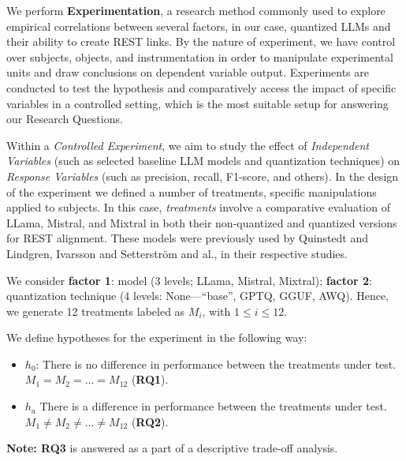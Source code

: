 \documentclass[conference]{IEEEtran}
\begin{document}
We perform \textbf{Experimentation}\cite{wohlin2012experimentation}, a research method commonly used
to explore empirical correlations between several factors, in our case,
quantized LLMs and their ability to create REST links. By the nature of
experiment, we have control over subjects, objects, and instrumentation in order
to manipulate experimental units and draw conclusions on dependent variable
output. Experiments are conducted to test the hypothesis and comparatively
access the impact of specific variables in a controlled setting, which is the
most suitable setup for answering our Research Questions.

Within a \textit{Controlled Experiment}, we aim to study the effect of
\textit{Independent Variables} (such as selected baseline LLM models and
quantization techniques) on \textit{Response Variables} (such as precision,
recall, F1-score, and others)\cite{wohlin2012experimentation}. In the design of
the experiment we defined a number of treatments, specific manipulations applied
to subjects\cite{wohlin2012experimentation}.  In this case, \textit{treatments}
involve a comparative evaluation of LLama, Mistral, and Mixtral in both their
non-quantized and quantized versions for REST alignment. These models were
previously used by Quinstedt and Lindgren, Ivarsson and Setterström and
al.\cite{quinstedt2024Optimizing},\cite{ivarsson2023automated} in their
respective studies. 



We consider \textbf{factor 1}: model (3 levels; LLama, Mistral, Mixtral);
\textbf{factor 2}: quantization technique (4 levels: None---``base'', GPTQ,
GGUF, AWQ). Hence, we generate 12 treatments labeled as $M_{i}$, with $1 \leq i
\leq 12$.

We define hypotheses for the experiment in the following way:
\begin{RQBox}
    \begin{itemize}
        \item $h_{0}$: There is no difference in performance between the treatments under test. $M_{1} = M_{2} = \dots = M_{12}$ (\textbf{RQ1}).
        \item $h_{a}$ There is a difference in performance between the treatments under test. $M_{1} \neq M_{2} \neq \dots \neq M_{12}$ (\textbf{RQ2}).
    \end{itemize}
    
    \textbf{Note: RQ3} is answered as a part of a descriptive trade-off
    analysis.
\end{RQBox}
\end{document}
